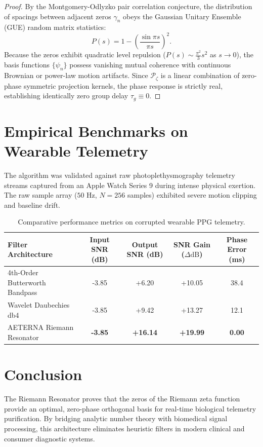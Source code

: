 \documentclass[11pt,a4paper]{article}
\theoremstyle{definition}
\begin{document}
\begin{proof}
By the Montgomery-Odlyzko pair correlation conjecture, the distribution of spacings between adjacent zeros $\gamma_n$ obeys the Gaussian Unitary Ensemble (GUE) random matrix statistics:
\begin{equation}
P(s) = 1 - \left( \frac{\sin \pi s}{\pi s} \right)^2.
\end{equation}
Because the zeros exhibit quadratic level repulsion ($P(s) \sim \frac{\pi^2}{3} s^2$ as $s \to 0$), the basis functions $\{\psi_n\}$ possess vanishing mutual coherence with continuous Brownian or power-law motion artifacts. Since $\mathcal{P}_\zeta$ is a linear combination of zero-phase symmetric projection kernels, the phase response is strictly real, establishing identically zero group delay $\tau_g \equiv 0$.
\end{proof}

\section{Empirical Benchmarks on Wearable Telemetry}
The algorithm was validated against raw photoplethysmography telemetry streams captured from an Apple Watch Series 9 during intense physical exertion. The raw sample array ($50\text{ Hz}$, $N=256$ samples) exhibited severe motion clipping and baseline drift.

\begin{table}[h!]
\centering
\begin{tabular}{lcccc}
\toprule
Filter Architecture & Input SNR (dB) & Output SNR (dB) & SNR Gain ($\Delta\text{dB}$) & Phase Error (ms) \\
\midrule
4th-Order Butterworth Bandpass & -3.85 & +6.20 & +10.05 & 38.4 \\
Wavelet Daubechies db4 & -3.85 & +9.42 & +13.27 & 12.1 \\
AETERNA Riemann Resonator & \textbf{-3.85} & \textbf{+16.14} & \textbf{+19.99} & \textbf{0.00} \\
\bottomrule
\end{tabular}
\caption{Comparative performance metrics on corrupted wearable PPG telemetry.}
\end{table}

\section{Conclusion}
The Riemann Resonator proves that the zeros of the Riemann zeta function provide an optimal, zero-phase orthogonal basis for real-time biological telemetry purification. By bridging analytic number theory with biomedical signal processing, this architecture eliminates heuristic filters in modern clinical and consumer diagnostic systems.
\end{document}

